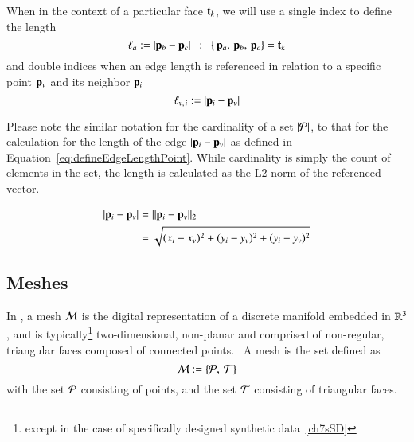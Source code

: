 When in the context of a particular face $\mathbf{t}_k$, we will use a single index to define the length
%
\begin{equation}
	\ell_a := |\mathbf{p}_b - \mathbf{p}_c| \enspace:\enspace \left \{\,\mathbf{p}_a,\,\mathbf{p}_b,\,\mathbf{p}_c\right \} = \mathbf{t}_k
	\label{eq:defineEdgeLengthFace}
\end{equation}%
%
%
and double indices when an edge length is referenced in relation to a specific point $\mathbf{p}_v$ and its neighbor $\mathbf{p}_i$
%
\begin{equation}
	\ell_{v,\kern.75pt i} := |\mathbf{p}_i - \mathbf{p}_v|
	\label{eq:defineEdgeLengthPoint}
\end{equation}%
%

Please note the similar notation for the cardinality of a set $|\mathcal{P}|$, to that for the calculation for the length of the edge $|\mathbf{p}_i - \mathbf{p}_v|$ as defined in Equation~\ref{eq:defineEdgeLengthPoint}. While cardinality is simply the count of elements in the set, the length is calculated as the L2-norm of the referenced vector.~\cite[p.~26]{Mara12}

\begin{equation}
\begin{aligned}
	|\mathbf{p}_i - \mathbf{p}_v| & = \lVert\mathbf{p}_i - \mathbf{p}_v\rVert_2 \\
					& = \sqrt{(x_i-x_v)^2 + (y_i-y_v)^2 + (y_i-y_v)^2}
	\label{eq:defineEdgeLengthCalc}
\end{aligned}
\end{equation}

%
%
%
%
\subsection{Meshes}
\label{ch2s3ssM}
In \tdd{}, a mesh $\mathcal{M}$ is the digital representation of a discrete manifold embedded in $\mathbb{R}^{3}$, and is typically\footnote{except in the case of specifically designed synthetic data~\ref{ch7sSD}} two-dimensional, non-planar and comprised of non-regular, triangular faces composed of connected points.~\cite[p.~25]{Mara12} A mesh is the set defined as
%
\begin{equation}
	\mathcal{M} := \left \{\mathcal{P},\:\mathcal{T}\right \}
	\label{eq:defineMesh}
\end{equation}%
%
%
with the set $\mathcal{P}$ consisting of points, and the set $\mathcal{T}$ consisting of triangular faces.

